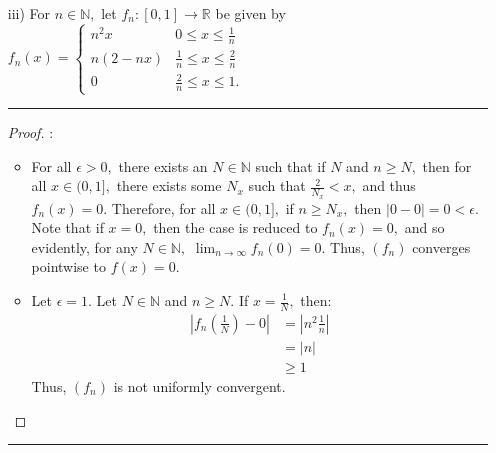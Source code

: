 \documentclass[openany, amssymb, psamsfonts]{amsart}
\newcommand{\bbN}{\mathbb{N}}
\newcommand{\bbR}{\mathbb{R}}
\theoremstyle{definition}
\numberwithin{equation}{section}
\begin{document}
\begin{enumerate}
\begin{proof}
\begin{itemize}
\item For all $\epsilon>0,$ there exists an $N \in \bbN$ such that $\frac{1}{N}< \epsilon.$ Therefore, if $n\geq N,$ then since $|\sin(nx)|<1:$
\begin{align*}
|f_n(x) - f(x)| &= \left|\frac{\sin(nx)}{n} - 0\right|\\
&= \left| \frac{1}{n}\right| |\sin(nx)|\\
&\leq \epsilon(1)\\
&= \epsilon
\end{align*}
Therefore, $f_n(x)$ converges uniformly to $f(x) = 0.$.
\item Because $f_n(x)$ converges uniformly, then it converges pointwise to $f(x) = 0.$
\end{itemize}
\end{proof}
\item[iii)] For $n\in\bbN,$ let $f_n\colon [0,1]\to \bbR$ be given by $f_n(x)=\begin{cases} n^2 x & 0\leq x\leq \frac{1}{n}\\ 
n(2-nx) & \frac{1}{n}\leq x\leq \frac{2}{n}\\ 0 & \frac{2}{n}\leq x\leq 1. 
\end{cases} $ 
\vspace{4pt}     \hrule   \vspace{4pt}\begin{proof}:\\
\begin{itemize}
\item For all $\epsilon>0,$ there exists an $N \in \bbN$ such that if $N$ and $n\geq N,$ then for all $x\in (0,1],$ there exists some $N_x$ such that $\frac{2}{N_x}< x,$ and thus $f_n(x) = 0.$ Therefore, for all $x\in (0,1],$ if $n\geq N_x,$ then $|0-0| = 0 < \epsilon.$ Note that if $x=0,$ then the case is reduced to $f_n(x) = 0,$ and so evidently, for any $N\in \bbN,$ $\displaystyle\lim_{n\to \infty}f_n(0) = 0.$ Thus, $(f_n)$ converges pointwise to $f(x) = 0.$
\item Let $\epsilon = 1.$ Let $N \in \bbN$ and $n\geq N.$ If $x = \frac{1}{N},$ then:
\begin{align*}
|f_n(\frac{1}{N}) - 0| &= |n^2\frac{1}{n}|\\
&= |n|\\
&\geq 1
\end{align*}
Thus, $(f_n)$ is not uniformly convergent. 
\end{itemize}
\end{proof}\vspace{4pt}     \hrule   \vspace{4pt}
\end{enumerate}
\end{document}
